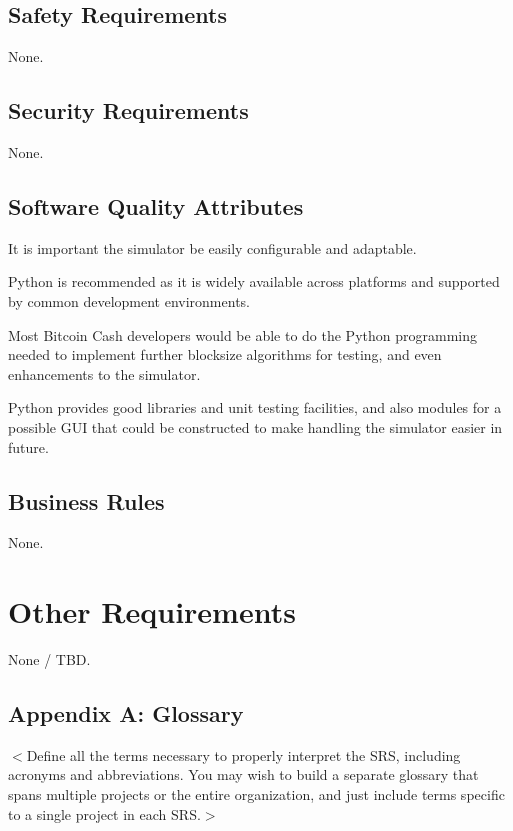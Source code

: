 \documentclass{scrreprt}
\begin{document}
  \section{Safety Requirements}

    None.

  \section{Security Requirements}

    None.

  \section{Software Quality Attributes}

    It is important the simulator be easily configurable and adaptable.

    Python is recommended as it is widely available across platforms and
    supported by common development environments.

    Most Bitcoin Cash developers would be able to do the Python programming
    needed to implement further blocksize algorithms for testing, and even
    enhancements to the simulator.

    Python provides good libraries and unit testing facilities, and also
    modules for a possible GUI that could be constructed to make handling
    the simulator easier in future.

  \section{Business Rules}

    None.

\chapter{Other Requirements}

  None / TBD.

  \section{Appendix A: Glossary}

    $<$Define all the terms necessary to properly interpret the SRS, including
    acronyms and abbreviations.
    You may wish to build a separate glossary that spans multiple projects
    or the entire organization, and just include terms specific to
    a single project in each SRS.$>$
\end{document}
